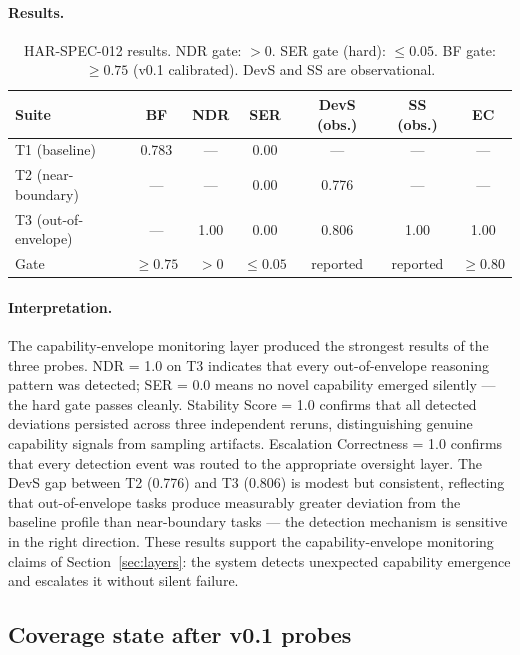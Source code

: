 \paragraph{Results.}

\begin{table}[h]
\centering
\caption{HAR-SPEC-012 results. NDR gate: $> 0$. SER gate (hard): $\leq 0.05$.
BF gate: $\geq 0.75$ (v0.1 calibrated). DevS and SS are observational.}
\label{tab:har012}
\begin{tabular}{lcccccc}
\toprule
Suite & BF & NDR & SER & DevS (obs.) & SS (obs.) & EC \\
\midrule
T1 (baseline)      & 0.783 & ---  & 0.00 & --- & --- & ---  \\
T2 (near-boundary) & ---   & ---  & 0.00 & 0.776 & --- & ---  \\
T3 (out-of-envelope) & --- & 1.00 & 0.00 & 0.806 & 1.00 & 1.00 \\
\midrule
Gate               & $\geq 0.75$ & $> 0$ & $\leq 0.05$ & reported & reported & $\geq 0.80$ \\
\bottomrule
\end{tabular}
\end{table}

\paragraph{Interpretation.}
The capability-envelope monitoring layer produced the strongest results
of the three probes. NDR = 1.0 on T3 indicates that every out-of-envelope
reasoning pattern was detected; SER = 0.0 means no novel capability
emerged silently — the hard gate passes cleanly. Stability Score = 1.0
confirms that all detected deviations persisted across three independent
reruns, distinguishing genuine capability signals from sampling artifacts.
Escalation Correctness = 1.0 confirms that every detection event was
routed to the appropriate oversight layer. The DevS gap between T2 (0.776)
and T3 (0.806) is modest but consistent, reflecting that out-of-envelope
tasks produce measurably greater deviation from the baseline profile than
near-boundary tasks — the detection mechanism is sensitive in the right
direction. These results support the capability-envelope monitoring claims
of Section~\ref{sec:layers}: the system detects unexpected capability
emergence and escalates it without silent failure.


\subsection{Coverage state after v0.1 probes}

